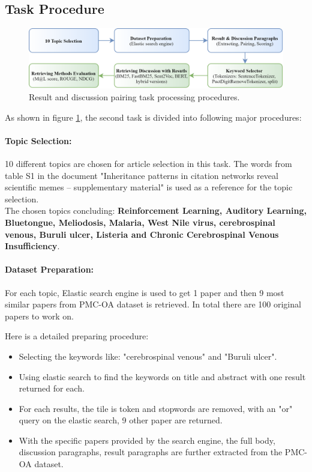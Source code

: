 \subsection{Task Procedure}

\begin{figure}[htbp]
	\includegraphics[width=\textwidth]{figure/taskB_procedure.png}
	\caption[]{Result and discussion pairing task processing procedures.}
	\label{fig: taskB_procedure}
\end{figure}

As shown in figure \ref{fig: taskB_procedure}, the second task is divided into following major procedures:

\paragraph{Topic Selection:}

10 different topics are chosen for article selection in this task. The words from table S1 in the document "Inheritance patterns in citation networks reveal scientific memes – supplementary material" \cite{Tobias_2014} is used as a reference for the topic selection. \\ 

The chosen topics concluding: \textbf{Reinforcement Learning, Auditory Learning, Bluetongue, Meliodosis, Malaria, West Nile virus, cerebrospinal venous, Buruli ulcer, Listeria and Chronic Cerebrospinal Venous Insufficiency}.

\paragraph{Dataset Preparation:}

For each topic, Elastic search engine is used to get 1 paper and then 9 most similar papers from PMC-OA dataset is retrieved. In total there are 100 original papers to work on.

Here is a detailed preparing procedure:
\begin{itemize}
	\item Selecting the keywords like: "cerebrospinal venous" and "Buruli ulcer".
	\item Using elastic search to find the keywords on title and abstract with one result returned for each. 
	\item For each results, the tile is token and stopwords are removed, with an "or" query on the elastic search, 9 other paper are returned.
	\item With the specific papers provided by the search engine, the full body, discussion paragraphs, result paragraphs are further extracted from the PMC-OA dataset.
\end{itemize}

